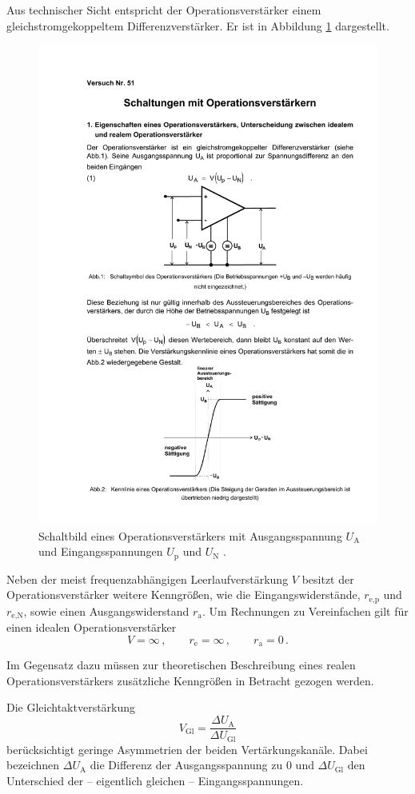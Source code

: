 Aus technischer Sicht entspricht der Operationsverstärker einem
gleichstromgekoppeltem Differenzverstärker. Er ist in Abbildung
\ref{fig:op} dargestellt.
\begin{figure}
    \centering
    \includegraphics[width=0.7\linewidth]{img/op.pdf}
    \caption{
        Schaltbild eines Operationsverstärkers mit Ausgangsspannung
        $U_\text{A}$ und Eingangsspannungen $U_\text{p}$ und
        $U_\text{N}$ \cite{V51}.
    }
    \label{fig:op}
\end{figure}
Neben der meist frequenzabhängigen Leerlaufverstärkung $V$ besitzt der
Operationsverstärker weitere Kenngrößen, wie die Eingangswiderstände,
$r_\text{e,p}$ und $r_\text{e,N}$, sowie 
einen Ausgangswiderstand $r_\text{a}$.
Um Rechnungen zu Vereinfachen gilt für einen idealen Operationsverstärker
\begin{equation}
\label{eq:id-verstärker}
    V = \infty\,,\qquad r_\text{e} = \infty\,,\qquad r_\text{a} = 0\,.
\end{equation}

Im Gegensatz dazu müssen zur theoretischen Beschreibung eines realen
Operationsverstärkers zusätzliche Kenngrößen in Betracht gezogen werden.

Die Gleichtaktverstärkung
\begin{equation}
\label{eq:gleichtaktverstärkung}
    V_\text{Gl} = \frac{\Delta U_\text{A}}{\Delta U_\text{Gl}}
\end{equation}
berücksichtigt geringe Asymmetrien der beiden Vertärkungskanäle.
Dabei bezeichnen $\Delta U_\text{A}$ die Differenz der Ausgangsspannung zu
\num{0} und $\Delta U_\text{Gl}$ den Unterschied der -- eigentlich gleichen --
Eingangsspannungen.

